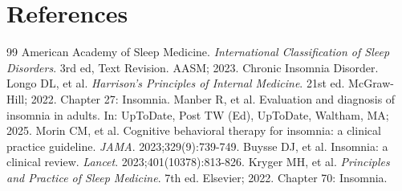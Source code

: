\section*{References}

\begin{thebibliography}{99}
 American Academy of Sleep Medicine. \emph{International Classification of Sleep Disorders}. 3rd ed, Text Revision. AASM; 2023. Chronic Insomnia Disorder.
 Longo DL, et al. \emph{Harrison's Principles of Internal Medicine}. 21st ed. McGraw-Hill; 2022. Chapter 27: Insomnia.
 Manber R, et al. Evaluation and diagnosis of insomnia in adults. In: UpToDate, Post TW (Ed), UpToDate, Waltham, MA; 2025.
 Morin CM, et al. Cognitive behavioral therapy for insomnia: a clinical practice guideline. \emph{JAMA}. 2023;329(9):739-749.
 Buysse DJ, et al. Insomnia: a clinical review. \emph{Lancet}. 2023;401(10378):813-826.
 Kryger MH, et al. \emph{Principles and Practice of Sleep Medicine}. 7th ed. Elsevier; 2022. Chapter 70: Insomnia.
\end{thebibliography}
